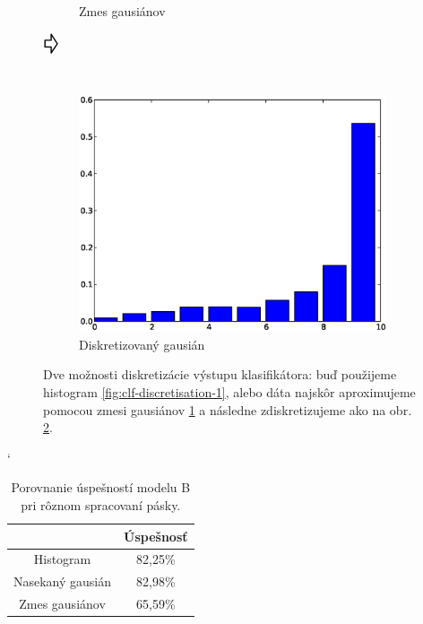 \begin{figure}[htp]
\begin{subfigure}[c]{0.3\textwidth}
                \caption{Zmes gausiánov}
                \label{fig:clf-discretisation-2}
        \end{subfigure}
        $\vcenter{\hbox{\raisebox{.8cm}{\Huge\pointer}}}$
        \begin{subfigure}[c]{0.3\textwidth}
                \includegraphics[width=\textwidth]{images/hist3}
                \caption{Diskretizovaný gausián}
                \label{fig:clf-discretisation-3}
        \end{subfigure}
        \caption[Diskretizácia výstupu klasifikátora]{Dve možnosti diskretizácie výstupu klasifikátora: buď použijeme histogram \ref{fig:clf-discretisation-1}, alebo dáta najskôr aproximujeme pomocou zmesi gausiánov \ref{fig:clf-discretisation-2} a následne zdiskretizujeme ako na obr. \ref{fig:clf-discretisation-3}.}
        \label{fig:clf-discretisation}
\end{figure}

\begin{table}[h]
\catcode`
\centering
\begin{tabular}{cc}
\toprule
& Úspešnosť\\
\midrule
Histogram & 82,25\%\\
Nasekaný gausián & 82,98\%\\
Zmes gausiánov & 65,59\%\\
\bottomrule
\end{tabular}
\vspace{0.5cm}
\caption[Porovnanie úspešností pri rôznom spracovaní pásky]{Porovnanie úspešností modelu B pri rôznom spracovaní pásky.}
\label{tab:success-b-tape}
\end{table}

